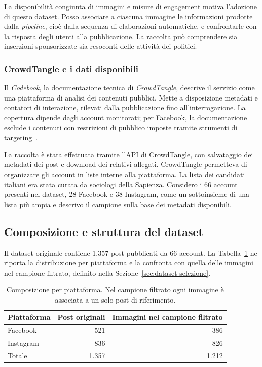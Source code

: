 La disponibilità congiunta di immagini e misure di engagement motiva l'adozione di questo dataset. Posso associare a ciascuna immagine le informazioni prodotte dalla \emph{pipeline}, cioè dalla sequenza di elaborazioni automatiche, e confrontarle con la risposta degli utenti alla pubblicazione. La raccolta può comprendere sia inserzioni sponsorizzate sia resoconti delle attività dei politici.

\subsubsection{CrowdTangle e i dati disponibili}
\label{subsec:dataset-crowdtangle}

Il \emph{Codebook}, la documentazione tecnica di \emph{CrowdTangle}, descrive il servizio come una piattaforma di analisi dei contenuti pubblici. Mette a disposizione metadati e contatori di interazione, rilevati dalla pubblicazione fino all'interrogazione. La copertura dipende dagli account monitorati; per Facebook, la documentazione esclude i contenuti con restrizioni di pubblico imposte tramite strumenti di targeting~\cite{DVN/SCCQYD_2019}.

La raccolta è stata effettuata tramite l'API di CrowdTangle, con salvataggio dei metadati dei post e download dei relativi allegati. CrowdTangle permetteva di organizzare gli account in liste interne alla piattaforma. La lista dei candidati italiani era stata curata da sociologi della Sapienza. Considero i 66 account presenti nel dataset, 28 Facebook e 38 Instagram, come un sottoinsieme di una lista più ampia e descrivo il campione sulla base dei metadati disponibili.

\subsection{Composizione e struttura del dataset}
\label{sec:dataset-struttura}

Il dataset originale contiene 1.357 post pubblicati da 66 account. La Tabella~\ref{tab:dataset-piattaforme} ne riporta la distribuzione per piattaforma e la confronta con quella delle immagini nel campione filtrato, definito nella Sezione~\ref{sec:dataset-selezione}.

\begin{table}[htbp]
    \centering
    \caption{Composizione per piattaforma. Nel campione filtrato ogni immagine è associata a un solo post di riferimento.}
    \label{tab:dataset-piattaforme}
    \begin{tabular}{lrr}
        \toprule
        Piattaforma & Post originali & Immagini nel campione filtrato \\
        \midrule
        Facebook  & 521   & 386   \\
        Instagram & 836   & 826   \\
        \midrule
        Totale    & 1.357 & 1.212 \\
        \bottomrule
    \end{tabular}
\end{table}


